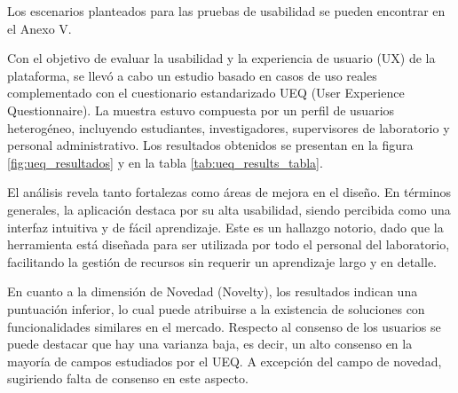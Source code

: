 Los escenarios planteados para las pruebas de usabilidad se pueden encontrar en el Anexo V.




Con el objetivo de evaluar la usabilidad y la experiencia de usuario (UX) de la plataforma, se llevó a cabo un estudio basado en casos de uso reales complementado con el cuestionario estandarizado UEQ (User Experience Questionnaire). \cite{ueq_online} La muestra estuvo compuesta por un perfil de usuarios heterogéneo, incluyendo estudiantes, investigadores, supervisores de laboratorio y personal administrativo. Los resultados obtenidos se presentan en la figura \ref{fig:ueq_resultados} y en la tabla \ref{tab:ueq_results_tabla}.

El análisis revela tanto fortalezas como áreas de mejora en el diseño. En términos generales, la aplicación destaca por su alta usabilidad, siendo percibida como una interfaz intuitiva y de fácil aprendizaje. Este es un hallazgo notorio, dado que la herramienta está diseñada para ser utilizada por todo el personal del laboratorio, facilitando la gestión de recursos sin requerir un aprendizaje largo y en detalle.

En cuanto a la dimensión de Novedad (Novelty), los resultados indican una puntuación inferior, lo cual puede atribuirse a la existencia de soluciones con funcionalidades similares en el mercado. Respecto al consenso de los usuarios se puede destacar que hay una varianza baja, es decir, un alto consenso en la mayoría de campos estudiados por el UEQ. A excepción del campo de novedad, sugiriendo falta de consenso en este aspecto.  


